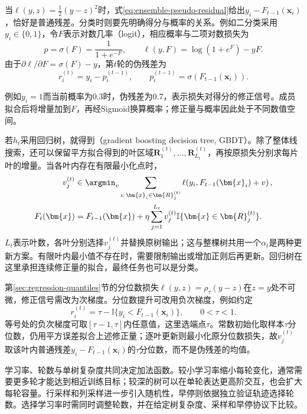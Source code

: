 当$\ell(y,z)=\tfrac12(y-z)^2$时，式\eqref{eq:ensemble-pseudo-residual}给出$y_i-F_{t-1}(\bm{x}_i)$，恰好是普通残差。分类时则要先明确得分与概率的关系。例如二分类采用$y_i\in\{0,1\}$，令$F$表示对数几率（logit），相应概率与二项对数损失为
\[
  p=\sigma(F)=\frac{1}{1+e^{-F}},\qquad
  \ell(y,F)=\log(1+e^F)-yF.
\]
由于$\partial\ell/\partial F=\sigma(F)-y$，第$t$轮的伪残差为
\[
  r_i^{(t)}=y_i-p_i^{(t-1)},\qquad
  p_i^{(t-1)}=\sigma\!\left(F_{t-1}(\bm{x}_i)\right).
\]


例如$y_i=1$而当前概率为$0.3$时，伪残差为$0.7$，表示损失对得分的修正信号。成员拟合后将增量加到$F$，再经Sigmoid换算概率；修正量与概率因此处于不同数值空间。

若$h_t$采用回归树，就得到（gradient boosting decision tree, GBDT）。除了整体线搜索，还可以保留平方拟合得到的叶区域$\bm{R}_1^{(t)},\ldots,\bm{R}_{L_t}^{(t)}$，再按原损失分别求每片叶的增量。当各叶内存在有限最小化点时，
\begin{equation}
  \begin{aligned}
    v_j^{(t)}
      &\in\argmin_v
        \sum_{i:\,\bm{x}_i\in\bm{R}_j^{(t)}}
        \ell\!\left(y_i,F_{t-1}(\bm{x}_i)+v\right),\\
    F_t(\bm{x})
      &=F_{t-1}(\bm{x})
        +\eta\sum_{j=1}^{L_t}
        v_j^{(t)}\mathbb{I}\{\bm{x}\in\bm{R}_j^{(t)}\}.
  \end{aligned}
  \label{eq:ensemble-gbm-leaf-update}
\end{equation}
$L_t$表示叶数，各叶分别选择$v_j^{(t)}$并替换原树输出；这与整棵树共用一个$\alpha_t$是两种更新方案。有限叶内最小值不存在时，需要限制输出或增加正则后再更新。回归树在这里承担连续修正量的拟合，最终任务也可以是分类。

第\ref{sec:regression-quantiles}节的分位数损失$\ell(y,z)=\rho_\tau(y-z)$在$z=y$处不可微，修正信号需改为次梯度。分位数提升可改用负次梯度，例如约定
\begin{equation}
  r_i^{(t)}
  =\tau-\mathbb{I}\{y_i<F_{t-1}(\bm{x}_i)\},
  \qquad 0<\tau<1.
  \label{eq:ensemble-quantile-pseudo-residual}
\end{equation}
等号处的负次梯度可取$[\tau-1,\tau]$内任意值，这里选端点$\tau$。常数初始化取样本$\tau$分位数，仍用平方误差拟合上述修正量；逐叶更新则最小化原分位数损失，故$v_j^{(t)}$取该叶内普通残差$y_i-F_{t-1}(\bm{x}_i)$的$\tau$分位数，而不是伪残差的均值。

学习率、轮数与单树复杂度共同决定加法函数。较小学习率缩小每轮变化，通常需要更多轮才能达到相近训练目标；较深的树可以在单轮表达更高阶交互，也会扩大每轮容量。行采样和列采样进一步引入随机性，早停则依据独立验证轨迹选择轮数。选择学习率时需同时调整轮数，并在给定树复杂度、采样和早停协议下比较。

